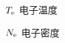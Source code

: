 \begin{denotation}

\item[$T_{\rm e}$] 电子温度
\item[$N_{\rm e}$] 电子密度
\item[]
\item[]
\item[]
\item[]
\item[]
\item[]
\item[]
\item[]
\item[]
\item[]
\item[]
\item[]
\item[]
\item[]
\item[]
\item[]

\end{denotation}
